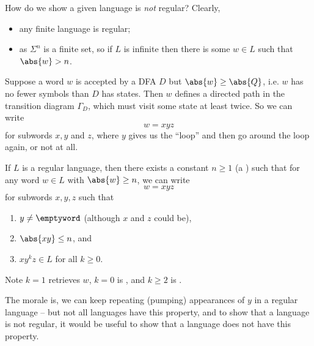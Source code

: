 How do we show a given language is \emph{not} regular? Clearly,
\begin{itemize}
    \item any finite language is regular;
    \item as \(\Sigma^n\) is a finite set, so if \(L\) is infinite then there is some \(w \in L\) such that \(\abs{w} > n\).
\end{itemize}

Suppose a word \(w\) is accepted by a DFA \(D\) but \(\abs{w} \geq \abs{Q}\), i.e. \(w\) has no fewer symbols than \(D\) has states. Then \(w\) defines a directed path in the transition diagram \(\Gamma_D\), which must visit some state at least twice. So we can write
\[
    w = xyz
\]
for subwords \(x, y\) and \(z\), where \(y\) gives us the ``loop'' and  then go around the loop again, or not at all.

\begin{theorem}
    \label{thm:pumping-lemma-for-regular-languages}%
    If \(L\) is a regular language, then there exists a constant \(n \geq 1\) (a ) such that for any word \(w \in L\) with \(\abs{w} \geq n\), we can write
    \[
        w = xyz
    \]
    for subwords \(x, y, z\) such that
    \begin{enumerate}[label=(\arabic*)]
        \item \(y \neq \emptyword\) (although \(x\) and \(z\) could be),
        \item \(\abs{xy} \leq n\), and
        \item \(xy^k z \in L\) for all \(k \geq 0\).
    \end{enumerate}

    Note \(k = 1\) retrieves \(w\), \(k = 0\) is , and \(k \geq 2\) is .
\end{theorem}

\begin{remark}
    The morale is, we can keep repeating (pumping) appearances of \(y\) in a regular language -- but not all languages have this property, and to show that a language is not regular, it would be useful to show that a language does not have this property.
\end{remark}

